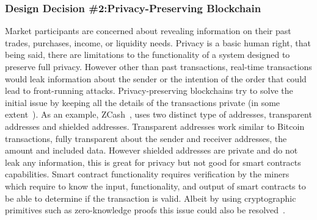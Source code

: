 \subsubsection{Design Decision \#2:Privacy-Preserving Blockchain\newline}
Market participants are concerned about revealing information on their past trades, purchases, income, or liquidity needs. Privacy is a basic human right, that being said, there are limitations to the functionality of a system designed to preserve full privacy. However other than past transactions, real-time transactions would leak information about the sender or the intention of the order that could lead to front-running attacks. Privacy-preserving blockchains try to solve the initial issue by keeping all the details of the transactions private (in some extent~\cite{miller2017empirical, kappos2018empirical}). 
As an example, ZCash~\cite{hopwood2016zcash}, uses two distinct type of addresses, transparent addresses and shielded addresses. Transparent addresses work similar to Bitcoin transactions, fully transparent about the sender and receiver addresses, the amount and included data. However shielded addresses are private and do not leak any information, this is great for privacy but not good for smart contracts capabilities. Smart contract functionality requires verification by the miners which require to know the input, functionality, and output of smart contracts to be able to determine if the transaction is valid. Albeit by using cryptographic primitives such as zero-knowledge proofs this issue could also be resolved~\cite{kosba2016hawk}. 


